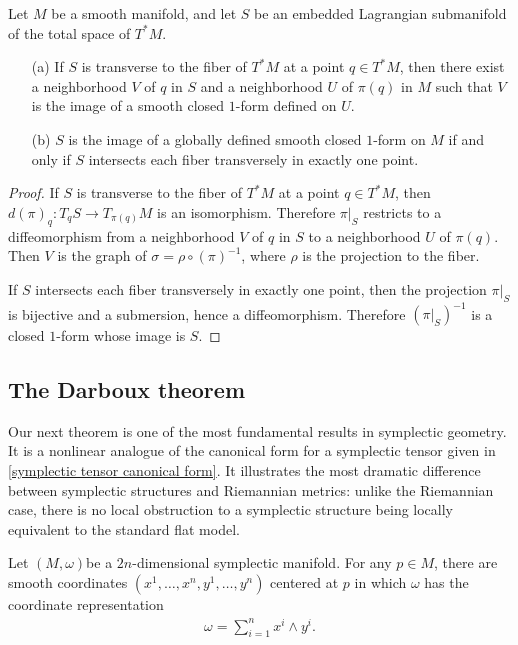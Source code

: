 \begin{proposition}\label{submani of T^*M is section iff}
Let $M$ be a smooth manifold, and let $S$ be an embedded Lagrangian submanifold of the total space of $T^*M$.
\begin{enumerate}
\item[(a)] If $S$ is transverse to the fiber of $T^*M$ at a point $q\in T^*M$, then there exist a neighborhood $V$ of $q$ in $S$ and a neighborhood $U$ of $\pi(q)$ in $M$ such that $V$ is the image of a smooth closed $1$-form defined on $U$.
\item[(b)] $S$ is the image of a globally defined smooth closed $1$-form on $M$ if and only if $S$ intersects each fiber transversely in exactly one point.
\end{enumerate}
\end{proposition}
\begin{proof}
If $S$ is transverse to the fiber of $T^*M$ at a point $q\in T^*M$, then $d(\pi)_q:T_{q}S\to T_{\pi(q)}M$ is an isomorphism. Therefore $\pi|_S$ restricts to a diffeomorphism from a neighborhood $V$ of $q$ in $S$ to a neighborhood $U$ of $\pi(q)$. Then $V$ is the graph of $\sigma=\rho\circ(\pi)^{-1}$, where $\rho$ is the projection to the fiber.\par
If $S$ intersects each fiber transversely in exactly one point, then the projection $\pi|_S$ is bijective and a submersion, hence a diffeomorphism. Therefore $(\pi|_S)^{-1}$ is a closed $1$-form whose image is $S$.
\end{proof}

\subsection{The Darboux theorem}
Our next theorem is one of the most fundamental results in symplectic geometry. It is a nonlinear analogue of the canonical form for a symplectic tensor given in \cref{symplectic tensor canonical form}. It illustrates the most dramatic difference between symplectic structures and Riemannian metrics: unlike the Riemannian case, there is no local obstruction to a symplectic structure being locally equivalent to the standard flat model.

\begin{theorem}
Let $(M,\omega)$be a $2n$-dimensional symplectic manifold. For any $p\in M$, there are smooth coordinates $(x^1,\dots,x^n,y^1,\dots,y^n)$ centered at $p$ in which $\omega$ has the coordinate representation
\begin{align}\label{Darboux theorem-1}
\omega=\sum_{i=1}^{n}x^i\wedge y^i.
\end{align}
\end{theorem}

